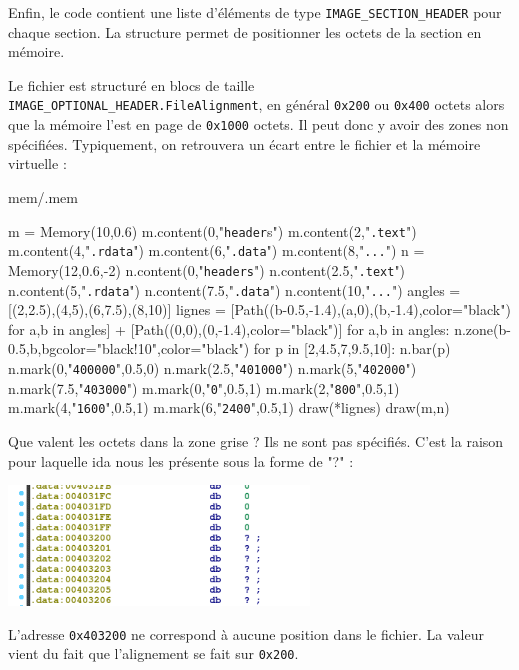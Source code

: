 \documentclass{book}
\newcounter{Qcours}
\newenvironment{memory}{%
	\noindent
	\VerbatimEnvironment\stepcounter{Qcours}%
	\begin{VerbatimOut}{mem/\theQcours.mem}%
	}{\end{VerbatimOut}%
}
\newcommand{\code}[1]{\texttt{#1}}
\begin{document}
Enfin, le code contient une liste d'éléments de type \code{IMAGE\_SECTION\_HEADER} pour chaque section. La structure permet de positionner les octets de la section en mémoire. 


Le fichier est structuré en blocs de taille \code{IMAGE\_OPTIONAL\_HEADER.FileAlignment}, en général \code{0x200} ou \code{0x400} octets alors que la mémoire l'est en page de \code{0x1000} octets. Il peut donc y avoir des zones non spécifiées. Typiquement, on retrouvera un écart entre le fichier et la mémoire virtuelle : 

\bigskip
\begin{memory}
m = Memory(10,0.6)
m.content(0,"\code{header}s")
m.content(2,"\code{.text}")
m.content(4,"\code{.rdata}")
m.content(6,"\code{.data}")
m.content(8,"\code{...}")
n = Memory(12,0.6,-2)
n.content(0,"\code{headers}")
n.content(2.5,"\code{.text}")
n.content(5,"\code{.rdata}")
n.content(7.5,"\code{.data}")
n.content(10,"\code{...}")	
angles = [(2,2.5),(4,5),(6,7.5),(8,10)]
lignes = [Path((b-0.5,-1.4),(a,0),(b,-1.4),color="black") for a,b in angles] + [Path((0,0),(0,-1.4),color="black")]
for a,b in angles:
	n.zone(b-0.5,b,bgcolor="black!10",color="black")
for p in [2,4.5,7,9.5,10]:
	n.bar(p)
n.mark(0,"\code{400000}",0.5,0)
n.mark(2.5,"\code{401000}")
n.mark(5,"\code{402000}")
n.mark(7.5,"\code{403000}")
m.mark(0,"\code{0}",0.5,1)
m.mark(2,"\code{800}",0.5,1)
m.mark(4,"\code{1600}",0.5,1)
m.mark(6,"\code{2400}",0.5,1)
draw(*lignes)
draw(m,n)
\end{memory}

Que valent les octets dans la zone grise ? Ils ne sont pas spécifiés. C'est la raison pour laquelle {\sc ida} nous les présente sous la forme de "?" : 

\includegraphics[width=8cm]{img/ida_zone_non_specifiee.png} 

L'adresse \code{0x403200} ne correspond à aucune position dans le fichier. La valeur vient du fait que l'alignement se fait sur \code{0x200}. 
\end{document}
